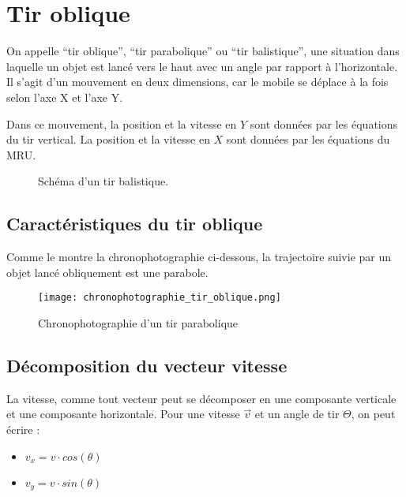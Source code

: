 \chapter{Tir oblique}
On appelle \enquote{tir oblique}, \enquote{tir parabolique} ou \enquote{tir balistique}, une situation dans laquelle un objet est lancé vers le haut avec un angle par rapport à l'horizontale. Il s'agit d'un mouvement en deux dimensions, car le mobile se déplace à la fois selon l'axe X et l'axe Y.
\begin{encadre}
    Dans ce mouvement, la position et la vitesse en \(Y\) sont données par les équations du tir vertical. La position et la vitesse en \(X\) sont données par les équations du MRU.
\end{encadre}

\begin{figure}[!ht]
    \centering
    \resizebox{\linewidth}{!}{}
    \caption{Schéma d'un tir balistique.}
    \label{Schéma d'un tir balistique}
\end{figure}

\newpage

\section{Caractéristiques du tir oblique}
Comme le montre la chronophotographie ci-dessous, la trajectoire suivie par un objet lancé obliquement est une parabole.

\begin{figure}[!ht]
    \centering
    \texttt{[image: chronophotographie\_tir\_oblique.png]}
    \caption{Chronophotographie d'un tir parabolique}
    \label{Chronophotographie d'un tir parabolique}
\end{figure}

\section{Décomposition du vecteur vitesse}
La vitesse, comme tout vecteur peut se décomposer en une composante verticale et une composante horizontale. Pour une vitesse \(\vec{v}\) et un angle de tir \(\Theta\), on peut écrire :
\begin{itemize}[label=\textbullet]
    \item \(v_x = v \cdot cos(\theta) \)
    \item \(v_y = v \cdot sin(\theta) \)
\end{itemize}

